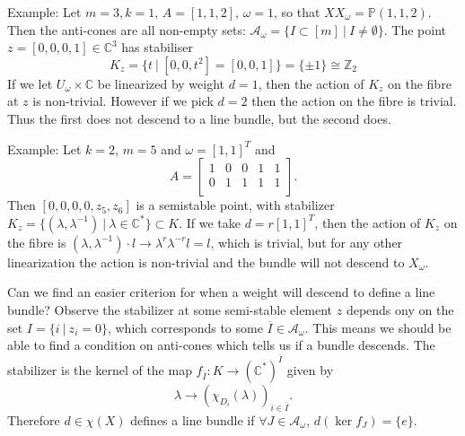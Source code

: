 \documentclass{article}
\theoremstyle{definition}
\theoremstyle{remark}
\numberwithin{theorem}{section}
\newcommand{\C}{\mathbb{C}}
\newcommand{\Z}{\mathbb{Z}}
\newcommand{\bP}{\mathbb{P}}
\newcommand{\cA}{\mathcal{A}}
\begin{document}
	Example: Let $m=3, k=1$, $A=[1,1,2]$, $\omega=1$, so that $XX_\omega = \bP(1,1,2)$. Then the anti-cones are all non-empty sets: $\cA_\omega = \{I \subset [m] ~|~ I\neq\emptyset\}$. The point $z=[0,0,0,1] \in \C^3$ has stabiliser
	$$K_z = \{t ~|~ [0,0,t^2] = [0,0,1]\} = \{\pm 1\} \cong \Z_2$$
	If we let $U_\omega \times \C$ be linearized by weight $d=1$, then the action of $K_z$ on the fibre at $z$ is non-trivial. However if we pick $d=2$ then the action on the fibre is trivial. Thus the first does not descend to a line bundle, but the second does. \vspace{1em}

	Example: Let $k=2$, $m=5$ and $\omega = [1,1]^T$ and 
	$$A = \begin{bmatrix}
		1 & 0 & 0 & 1 & 1 \\
		0 & 1 & 1 & 1 & 1 \\
	\end{bmatrix}.$$
	Then $[0,0,0,0,z_5,z_6]$ is a semistable point, with stabilizer $K_z = \{(\lambda,\lambda^{-1}) ~|~ \lambda \in \C^\ast\} \subset K$. If we take $d=r[1,1]^T$, then the action of $K_z$ on the fibre is $(\lambda, \lambda^{-1})\cdot l \to \lambda^r\lambda^{-r} l = l$, which is trivial, but for any other linearization the action is non-trivial and the bundle will not descend to $X_\omega$. \vspace{1em}

	Can we find an easier criterion for when a weight will descend to define a line bundle? Observe the stabilizer at some semi-stable element $z$ depends ony on the set $I=\{i ~|~ z_i=0\}$, which corresponds to some $\overline{I}\in \cA_\omega$. This means we should be able to find a condition on anti-cones which tells us if a bundle descends. The stabilizer is the kernel of the map $f_{\overline{I}}:K\to (\C^\ast)^{\overline{I}}$ given by 
	$$\lambda \to (\chi_{D_i}(\lambda))_{i\in\overline{I}}.$$
	Therefore $d\in \chi(X)$ defines a line bundle if $\forall J\in \cA_\omega$, $d(\ker f_J) = \{e\}$. \vspace{1em}
	
\end{document}
